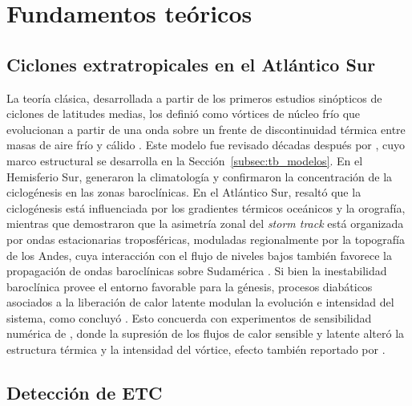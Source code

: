 \chapter{Fundamentos teóricos}\label{ch:theoretical_background}


\section{Ciclones extratropicales en el Atlántico Sur}\label{sec:tb_fundamentos}

La teoría clásica, desarrollada a partir de los primeros estudios sinópticos de ciclones de latitudes medias, los definió como vórtices de núcleo frío que evolucionan a partir de una onda sobre un frente de discontinuidad térmica entre masas de aire frío y cálido \citep{bjerknes1922life}.
Este modelo fue revisado décadas después por \citet{shapiro1990life}, cuyo marco estructural se desarrolla en la Sección~\ref{subsec:tb_modelos}.
En el Hemisferio Sur, \citet{hoskins2005new} generaron la climatología y confirmaron la concentración de la ciclogénesis en las zonas baroclínicas.
En el Atlántico Sur, \citet{sinclair1995climatology} resaltó que la ciclogénesis está influenciada por los gradientes térmicos oceánicos y la orografía, mientras que \citet{inatsu2004zonal} demostraron que la asimetría zonal del \textit{storm track} está organizada por ondas estacionarias troposféricas, moduladas regionalmente por la topografía de los Andes, cuya interacción con el flujo de niveles bajos también favorece la propagación de ondas baroclínicas sobre Sudamérica \citep{vera2002cold}.
Si bien la inestabilidad baroclínica provee el entorno favorable para la génesis, procesos diabáticos asociados a la liberación de calor latente modulan la evolución e intensidad del sistema, como concluyó \citet{coutodesouza2024thesis}. 
Esto concuerda con experimentos de sensibilidad numérica de \citet{reboita2022from}, donde la supresión de los flujos de calor sensible y latente alteró la estructura térmica y la intensidad del vórtice, efecto también reportado por \citet{gozzo2013air}.

\section{Detección de ETC}\label{sec:tb_vorticidad}

